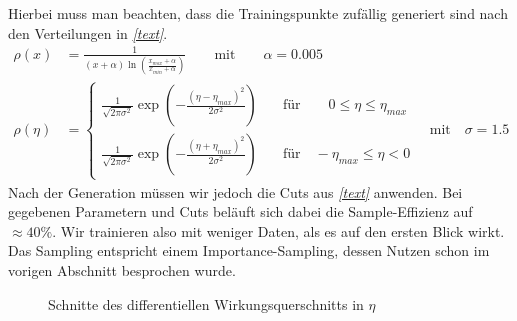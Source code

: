 Hierbei muss man beachten, dass die Trainingspunkte zufällig generiert sind nach den Verteilungen in \textit{\autoref{text}}. 
\begin{equation}
	\begin{aligned}
	\rho(x) &= \frac{1}{(x + \alpha)\ln(\frac{x_{max} + \alpha}{x_{min}+ \alpha})} \qquad \text{mit} \qquad \alpha = 0.005 \\
	\rho(\eta) &= \begin{cases}
	\frac{1}{\sqrt{2\pi \sigma^2}} \exp(-\frac{(\eta - \eta_{max})^2}{2\sigma^2}) \quad & \text{für} \qquad 0 \leq \eta \leq \eta_{max}\\
	\frac{1}{\sqrt{2\pi \sigma^2}} \exp(-\frac{(\eta + \eta_{max})^2}{2\sigma^2}) \quad & \text{für} \quad -\eta_{max} \leq \eta < 0
	\end{cases} \quad \text{mit} \quad \sigma = 1.5
	\end{aligned}
\end{equation}
Nach der Generation müssen wir jedoch die Cuts aus \textit{\autoref{text}} anwenden. Bei gegebenen Parametern und Cuts beläuft sich dabei die Sample-Effizienz auf $\approx 40\%$. Wir trainieren also mit weniger Daten, als es auf den ersten Blick wirkt. Das Sampling entspricht einem Importance-Sampling, dessen Nutzen schon im vorigen Abschnitt besprochen wurde. 
\begin{figure}[tbp]
	\centering
	\caption{Schnitte des differentiellen Wirkungsquerschnitts in $\eta$}
	\label{5,8}
\end{figure}
